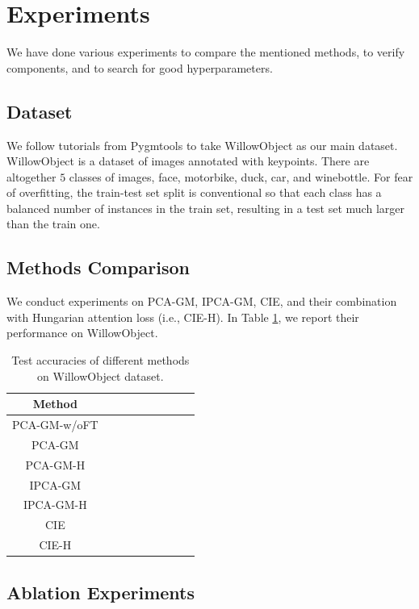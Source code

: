 \documentclass[a4paper]{article}
\begin{document}
\section{Experiments}
We have done various experiments to compare the mentioned methods, to verify components, and to search for good hyperparameters. 

\subsection{Dataset}
We follow tutorials from Pygmtools \cite{pygmtools} to take WillowObject \cite{willow} as our main dataset. WillowObject is a dataset of images annotated with keypoints. There are altogether $5$ classes of images, face, motorbike, duck, car, and winebottle. For fear of overfitting, the train-test set split is conventional so that each class has a balanced number of instances in the train set, resulting in a test set much larger than the train one. 

\subsection{Methods Comparison}
We conduct experiments on PCA-GM, IPCA-GM, CIE, and their combination with Hungarian attention loss (i.e., CIE-H). In Table \ref{tab:compare}, we report their performance on WillowObject.

\begin{table}[htbp]
    \centering
    \begin{tabular}{ccccccccc}
        \toprule
        Method& \\
        \midrule
        PCA-GM-w/oFT& \\
        PCA-GM& \\
        PCA-GM-H& \\
        IPCA-GM& \\
        IPCA-GM-H& \\
        CIE& \\
        CIE-H& \\
        \bottomrule
    \end{tabular}
    \caption{Test accuracies of different methods on WillowObject dataset.}
    \label{tab:compare}
\end{table}

\subsection{Ablation Experiments}
\end{document}
